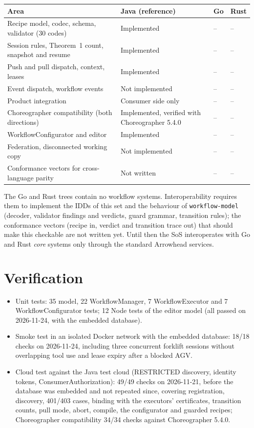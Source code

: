 \documentclass[a4paper]{arrowhead}
\begin{document}
{\small
\begin{longtable}{|p{6.6cm}|p{5.0cm}|p{2.1cm}|p{2.1cm}|}

\hline
\rowcolor{gray!33} Area & Java (reference) & Go & Rust \\ \hline
\endhead
Recipe model, codec, schema, validator (30 codes) & Implemented & -- & -- \\ \hline
Session rules, Theorem~1 count, snapshot and resume & Implemented & -- & -- \\ \hline
Push and pull dispatch, context, leases & Implemented & -- & -- \\ \hline
Event dispatch, workflow events & Not implemented & -- & -- \\ \hline
Product integration & Consumer side only & -- & -- \\ \hline
Choreographer compatibility (both directions) & Implemented, verified with Choreographer 5.4.0 & -- & -- \\ \hline
WorkflowConfigurator and editor & Implemented & -- & -- \\ \hline
Federation, disconnected working copy & Not implemented & -- & -- \\ \hline
Conformance vectors for cross-language parity & Not written & -- & -- \\ \hline
\end{longtable}
}

The Go and Rust trees contain no workflow systems. Interoperability requires them to implement the IDDs of this set and
the behaviour of \texttt{workflow-\allowbreak{}model} (decoder, validator findings and verdicts, guard grammar, transition rules); the
conformance vectors (recipe in, verdict and transition trace out) that should make this checkable are not written yet.
Until then the SoS interoperates with Go and Rust \emph{core} systems only through the standard Arrowhead services.

\section{Verification}
\label{sec:verification}
\begin{itemize}
\item Unit tests: 35 model, 22 WorkflowManager, 7 WorkflowExecutor and 7 WorkflowConfigurator tests; 12 Node tests of the
editor model (all passed on 2026-11-24, with the embedded database).
\item Smoke test in an isolated Docker network with the embedded database: 18/18 checks on 2026-11-24, including three concurrent forklift sessions without
overlapping tool use and lease expiry after a blocked AGV.
\item Cloud test against the Java test cloud (RESTRICTED discovery, identity tokens, ConsumerAuthorization):
49/49 checks on 2026-11-21, before the database was embedded and not repeated since, covering registration, discovery, 401/403 cases, binding with the executors' certificates, transition
counts, pull mode, abort, compile, the configurator and guarded recipes; Choreographer compatibility 34/34 checks
against Choreographer 5.4.0.
\end{itemize}
\end{document}
